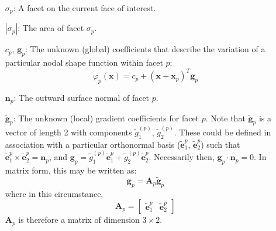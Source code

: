 \documentclass[11pt]{article} %
\begin{document}
\begin{itemize}
	\item[$\sigma_p$:] A facet on the current face of interest.
	\item[$| \sigma_p |$:] The area of facet $\sigma_p$.
	\item[$c_p$, $\mathbf{g}_p$:] The unknown (global) coefficients that describe the variation of a particular nodal shape function within facet $p$:
	\begin{equation}
		\varphi_p (\mathbf{x}) = c_p + (\mathbf{x} - \mathbf{x}_p)^T \mathbf{g}_p
	\end{equation}
	\item[$\mathbf{n}_p$:] The outward surface normal of facet $p$.
	\item[$\tilde{\mathbf{g}}_p$:] The unknown (local) gradient coefficients for facet $p$. Note that $\tilde{\mathbf{g}}_p$ is a vector of length 2 with components $\tilde{g}^{(p)}_1$, $\tilde{g}^{(p)}_2$. These could be defined in association with a particular orthonormal basis ($\tilde{\mathbf{e}}^p_1$, $\tilde{\mathbf{e}}^p_2$) such that $\tilde{\mathbf{e}}^p_1 \times \tilde{\mathbf{e}}^p_2 = \mathbf{n}_p$, and $\mathbf{g}_p = \tilde{g}^{(p)}_1 \tilde{\mathbf{e}}^p_1 + \tilde{g}^{(p)}_2 \tilde{\mathbf{e}}^p_2$. Necessarily then, $\mathbf{g}_p \cdot \mathbf{n}_p = 0$. In matrix form, this may be written as:
	\begin{equation}
		\mathbf{g}_p = \mathbf{A}_p \tilde{\mathbf{g}}_p
	\end{equation}
	where in this circumstance,
	\begin{equation}
		\mathbf{A}_p = \left[ \begin{array}{cc} \tilde{\mathbf{e}}^p_1 & \tilde{\mathbf{e}}^p_2 \end{array} \right]
	\end{equation}
	$\mathbf{A}_p$ is therefore a matrix of dimension $3 \times 2$.


\end{itemize}
\end{document}
